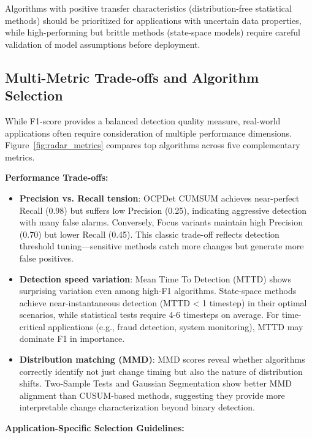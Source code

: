 Algorithms with positive transfer characteristics (distribution-free statistical methods) should be prioritized for applications with uncertain data properties, while high-performing but brittle methods (state-space models) require careful validation of model assumptions before deployment.


\subsection{Multi-Metric Trade-offs and Algorithm Selection}

While F1-score provides a balanced detection quality measure, real-world applications often require consideration of multiple performance dimensions. Figure~\ref{fig:radar_metrics} compares top algorithms across five complementary metrics.

\textbf{Performance Trade-offs:}

\begin{itemize}
    \item \textbf{Precision vs. Recall tension}: OCPDet CUMSUM achieves near-perfect Recall (0.98) but suffers low Precision (0.25), indicating aggressive detection with many false alarms. Conversely, Focus variants maintain high Precision (0.70) but lower Recall (0.45). This classic trade-off reflects detection threshold tuning—sensitive methods catch more changes but generate more false positives.
    
    \item \textbf{Detection speed variation}: Mean Time To Detection (MTTD) shows surprising variation even among high-F1 algorithms. State-space methods achieve near-instantaneous detection (MTTD < 1 timestep) in their optimal scenarios, while statistical tests require 4-6 timesteps on average. For time-critical applications (e.g., fraud detection, system monitoring), MTTD may dominate F1 in importance.
    
    \item \textbf{Distribution matching (MMD)}: MMD scores reveal whether algorithms correctly identify not just change timing but also the nature of distribution shifts. Two-Sample Tests and Gaussian Segmentation show better MMD alignment than CUSUM-based methods, suggesting they provide more interpretable change characterization beyond binary detection.
\end{itemize}

\textbf{Application-Specific Selection Guidelines:}

